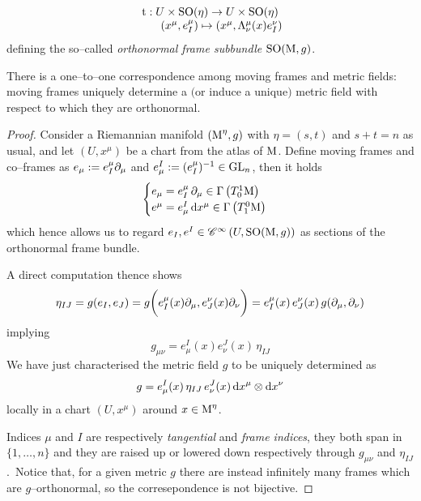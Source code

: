 $$\begin{matrix}
    \text{\normalfont t}:U\times\text{\normalfont SO}(\eta)\to U\times\text{\normalfont SO}(\eta)\\
    \qquad (x^\mu,e_I^\mu)\mapsto(x^\mu,\Lambda^\mu_\nu(x)e_I^\nu)
\end{matrix}$$
defining the so--called \emph{orthonormal frame subbundle} $\text{\normalfont SO}(\text{\normalfont M},g)$.
\begin{prop}\label{metric_1_1_frames}
    There is a one--to--one correspondence among moving frames and metric fields:\, moving frames uniquely determine a $($or induce a unique$)$ metric field with respect to which they are orthonormal.%
\end{prop}

\begin{proof}
    Consider a Riemannian manifold $(\text{\normalfont M}^\eta,g)$ with $\eta=(s,t)$ and $s+t=n$ as usual, and let $(U,x^\mu)$ be a chart from the atlas of $\text{\normalfont M}$. Define moving frames and co--frames as $e_\mu:=e_I^\mu\partial_\mu$ and $e^I_\mu:=({e^\mu_I})^{-1}\in\text{\normalfont GL}_n$, then it holds
$$\begin{cases}
    e_\mu=e_I^\mu\,\partial_\mu\in\Gamma\left(T^1_0\text{\normalfont M}\right)\\
    e^\mu=e^I_\mu\,\text{\normalfont d} x^\mu\in\Gamma\left(T_1^0\text{\normalfont M}\right)
\end{cases}$$
 which hence allows us to regard $e_I,e^I\in\mathscr{C}^\infty\left({U,{\text{\normalfont SO}(\text{\normalfont M},g)}}\right)$ as sections of the orthonormal frame bundle.
 
 A direct computation thence shows
$$\eta_{IJ}=g(e_I,e_J)=g\bigg(e^\mu_I(x)\partial_\mu,e^\nu_J(x)\partial_\nu\bigg)=e^\mu_I(x)\,e^\nu_J(x)\,g(\partial_\mu,\partial_\nu)$$
implying
$$g_{\mu\nu}=e^I_\mu(x) e_\nu^J(x)\,\eta_{IJ}$$
We have just characterised the metric field $g$ to be uniquely determined as
$$g=e^I_\mu(x)\,\eta_{IJ}\,e_\nu^J(x)\,\text{\normalfont d} x^\mu\otimes\text{\normalfont d} x^\nu$$
locally in a chart $(U,x^\mu)$ around $x\in\text{\normalfont M}^\eta$.

Indices $\mu$ and $I$ are respectively \emph{tangential} and \emph{frame indices}, they both span in $\{1,\hdots,n\}$ and they are raised up or lowered down respectively through $g_{\mu\nu}$ and $\eta_{IJ}$.\, Notice that, for a given metric $g$ there are instead infinitely many frames which are $g$--orthonormal, so the corresepondence is not bijective.


\end{proof}




